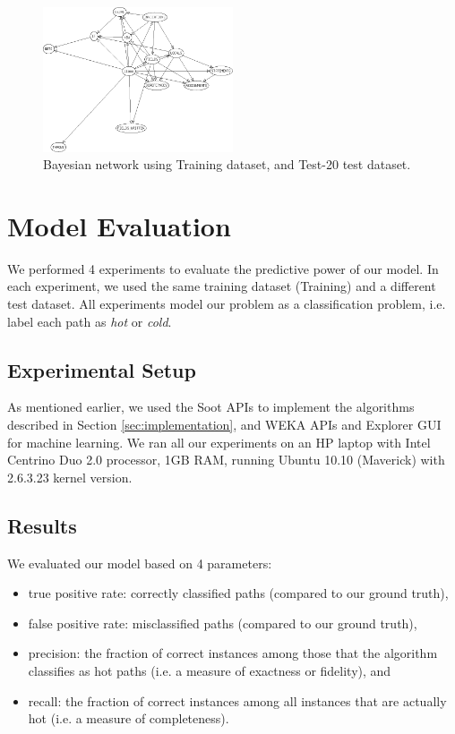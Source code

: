 \documentclass[10pt,twocolumn,letterpaper]{article}
\begin{document}
\begin{figure}[h!]
\centering
\includegraphics[width=0.5\textwidth]{imgs/bayes.png}
\caption{Bayesian network using Training dataset, and Test-20 test dataset.}
\label{fig:bayes}
\end{figure}

\section{Model Evaluation}
\label{sec:results}
We performed 4 experiments to evaluate the predictive power of our model. In each experiment, we used the same training dataset (Training) and a different test
dataset. All experiments model our problem as a classification problem, i.e. label each path as \textit{hot} or \textit{cold}.

\subsection{Experimental Setup}
As mentioned earlier, we used the Soot \cite{vallee1999soot} APIs to implement the algorithms described in Section \ref{sec:implementation}, and WEKA
\cite{hall2009weka} APIs and Explorer GUI for machine learning. We ran all our experiments on an HP laptop with Intel Centrino Duo 2.0 processor, 1GB RAM,
running Ubuntu 10.10 (Maverick) with 2.6.3.23 kernel version.

\subsection{Results}
We evaluated our model based on 4 parameters:
\begin{itemize}
  \item true positive rate: correctly classified paths (compared to our ground truth),
  \item false positive rate: misclassified paths (compared to our ground truth),
  \item precision: the fraction of correct instances among those that the algorithm classifies as hot paths (i.e. a measure of exactness or fidelity), and
  \item recall: the fraction of correct instances among all instances that are actually hot (i.e. a measure of completeness).
\end{itemize}
\end{document}
